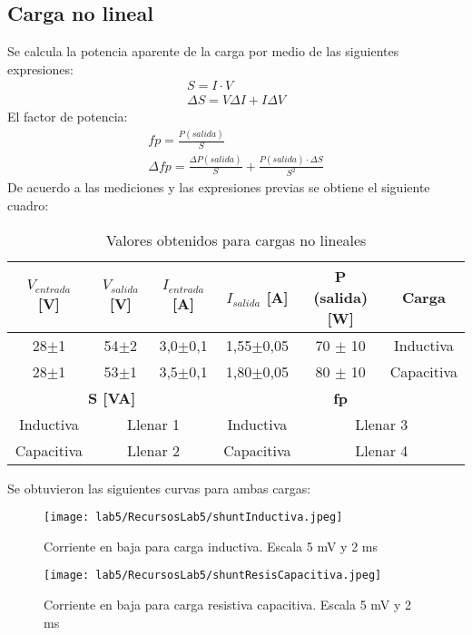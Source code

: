 \documentclass[11pt,letterpaper]{article}     %
\begin{document}
\subsection{Carga no lineal}
Se calcula la potencia aparente de la carga por medio de las siguientes expresiones:
\begin{align}
    S = I\cdot V\\
    \Delta S = V\Delta I + I\Delta V
\end{align}
El factor de potencia:
\begin{align}
    fp = \frac{P(salida)}{S} \\
    \Delta fp = \frac{\Delta P(salida) }{S} + \frac{P(salida)\cdot \Delta S}{S^{2}}
\end{align}
De acuerdo a las mediciones y las expresiones previas se obtiene el siguiente cuadro:
\begin{table}[H]
\centering
\caption{Valores obtenidos para cargas no lineales}
\label{ValoresCNL}
\begin{tabular}{|c|c|c|c|c|c|}
\hline
\textbf{$V_{entrada}$ {[}V{]}} & \textbf{$V_{salida}$ {[}V{]}} & \textbf{$I_{entrada}$ {[}A{]}} & \textbf{$I_{salida}$ {[}A{]}} & \textbf{P (salida) {[}W{]}} & \textbf{Carga} \\ \hline
28$\pm$1                       & 54$\pm$2                      & 3,0$\pm$0,1                    & 1,55$\pm$0,05                 & 70 $\pm$ 10                 & Inductiva      \\ \hline
28$\pm$1                       & 53$\pm$1                      & 3,5$\pm$0,1                    & 1,80$\pm$0,05                 & 80 $\pm$ 10                 & Capacitiva     \\ \hline
\multicolumn{3}{|c|}{\textbf{S {[}VA{]}}}                                                       & \multicolumn{3}{c|}{\textbf{fp}}                                             \\ \hline
Inductiva                      & \multicolumn{2}{c|}{Llenar 1}                                  & Inductiva                     & \multicolumn{2}{c|}{Llenar 3}                \\ \hline
Capacitiva                     & \multicolumn{2}{c|}{Llenar 2}                                  & Capacitiva                    & \multicolumn{2}{c|}{Llenar 4}                \\ \hline
\end{tabular}
\end{table}
Se obtuvieron las siguientes curvas para ambas cargas:
\begin{figure}[H]
    \centering
    \texttt{[image: lab5/RecursosLab5/shuntInductiva.jpeg]}
    \caption{Corriente en baja para carga inductiva. Escala 5 mV y 2 ms}
    \label{shuntInductiva}
\end{figure}
\begin{figure}[H]
    \centering
    \texttt{[image: lab5/RecursosLab5/shuntResisCapacitiva.jpeg]}
    \caption{Corriente en baja para carga resistiva capacitiva. Escala 5 mV y 2 ms}
    \label{shuntResisCapacitiva}
\end{figure}
\end{document}
